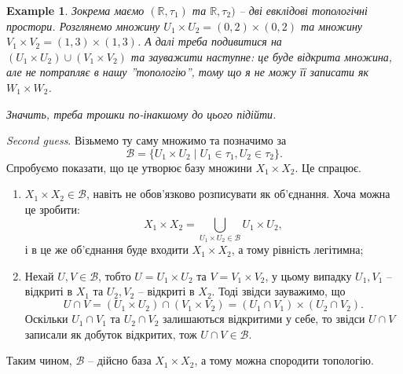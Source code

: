 \documentclass[a4paper, 10pt]{article}
\theoremstyle{theoremdd}
\newtheorem{example}[theorem]{Example}
\begin{document}
\begin{example}
Зокрема маємо $(\mathbb{R},\tau_1)$ та $\mathbb{R},\tau_2)$ -- дві евклідові топологічні простори. Розглянемо множину $U_1 \times U_2 = (0,2) \times (0,2)$ та множину $V_1 \times V_2 = (1,3) \times (1,3)$. А далі треба подивитися на $(U_1 \times U_2) \cup (V_1 \times V_2)$ та зауважити наступне: це буде відкрита множина, але не потрапляє в нашу ''топологію'', тому що я не можу її записати як $W_1 \times W_2$.
\begin{figure}[H]
\centering
{}
\qquad
{}
\end{figure}
\noindent
Значить, треба трошки по-інакшому до цього підійти.
\end{example}
\noindent
\textit{Second guess}. Візьмемо ту саму множимо та позначимо за
\[
\mathcal{B} = \{U_1 \times U_2 \mid U_1 \in \tau_1, U_2 \in \tau_2\}.
\]
Спробуємо показати, що це утворює базу множини $X_1 \times X_2$. Це спрацює.
\begin{enumerate}[nosep,wide=0pt,label={\arabic*)}]
\item $X_1 \times X_2 \in \mathcal{B}$, навіть не обов'язково розписувати як об'єднання. Хоча можна це зробити: 
\[
X_1 \times X_2 = \displaystyle\bigcup_{U_1 \times U_2 \in \mathcal{B}} U_1 \times U_2,
\] і в це же об'єднання буде входити $X_1 \times X_2$, а тому рівність легітимна;
\item Нехай $U,V \in \mathcal{B}$, тобто $U = U_1 \times U_2$ та $V = V_1 \times V_2$, у цьому випадку $U_1,V_1$ -- відкриті в $X_1$ та $U_2,V_2$ -- відкриті в $X_2$. Тоді звідси зауважимо, що 
\[
U \cap V = (U_1 \times U_2) \cap (V_1 \times V_2) = (U_1 \cap V_1) \times (U_2 \cap V_2).
\] 
Оскільки $U_1 \cap V_1$ та $U_2 \cap V_2$ залишаються відкритими у себе, то звідси $U \cap V$ записали як добуток відкритих, тож $U \cap V \in \mathcal{B}$.
\end{enumerate}
Таким чином, $\mathcal{B}$ -- дійсно база $X_1 \times X_2$, а тому можна спородити топологію.
\end{document}

